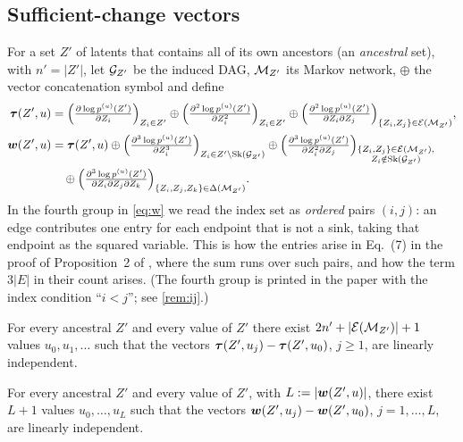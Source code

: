 \subsection{Sufficient-change vectors}
For a set $Z'$ of latents that contains all of its own ancestors (an \emph{ancestral} set), with
$n'=|Z'|$, let $\mathcal{G}_{Z'}$ be the induced DAG, $\mathcal{M}_{Z'}$ its Markov network, $\oplus$ the vector 
concatenation symbol and define
\begin{align}
\boldsymbol{\tau}(Z',u) &= \Bigl(\tfrac{\partial\log p^{(u)}(Z')}{\partial Z_i}\Bigr)_{Z_i\in Z'}
\oplus\Bigl(\tfrac{\partial^2\log p^{(u)}(Z')}{\partial Z_i^2}\Bigr)_{Z_i\in Z'}
\oplus\Bigl(\tfrac{\partial^2\log p^{(u)}(Z')}{\partial Z_i\partial Z_j}\Bigr)_{\{Z_i,Z_j\}\in \mathcal{E}(\mathcal{M}_{Z'})},
\label{eq:tau}\\[2pt]
\boldsymbol{w}(Z',u) &= \boldsymbol{\tau}(Z',u)
\oplus\Bigl(\tfrac{\partial^3\log p^{(u)}(Z')}{\partial Z_i^3}\Bigr)_{Z_i\in Z'\setminus\mathrm{Sk}(\mathcal{G}_{Z'})}
\oplus\Bigl(\tfrac{\partial^3\log p^{(u)}(Z')}{\partial Z_i^2\partial Z_j}\Bigr)_{\substack{\{Z_i,Z_j\}\in \mathcal{E}(\mathcal{M}_{Z'}),\\ Z_i\notin\mathrm{Sk}(\mathcal{G}_{Z'})}} \nonumber \\
& \quad \oplus\Bigl(\tfrac{\partial^3\log p^{(u)}(Z')}{\partial Z_i\partial Z_j\partial Z_k}\Bigr)_{\{Z_i,Z_j,Z_k\}\in\Delta(\mathcal{M}_{Z'})}.
\label{eq:w}
\end{align}
In the fourth group in \cref{eq:w} we read the index set as \emph{ordered} pairs $(i,j)$: an edge contributes one entry for each endpoint that is not a sink, taking that endpoint as the squared variable. This is how
the entries arise in Eq.~(7) in the proof of Proposition~2 of \cite{ng2025}, where the sum runs over
such pairs, and how the term $3|E|$ in their count arises. (The fourth group is printed in the paper with
the index condition ``$i<j$''; see \cref{rem:ij}.)

\begin{assumption}\label{as:1}
For every ancestral $Z'$ and every value of $Z'$ there exist $2n'+|\mathcal{E}(\mathcal{M}_{Z'})|+1$ values
$u_0,u_1,\dots$ such that the vectors $\boldsymbol{\tau}(Z',u_j)-\boldsymbol{\tau}(Z',u_0)$, $j\ge1$, are linearly
independent.
\end{assumption}

\begin{assumption}\label{as:2}
For every ancestral $Z'$ and every value of $Z'$, with $L:=|\boldsymbol{w}(Z',u)|$, there exist $L+1$ values
$u_0,\dots,u_L$ such that the vectors $\boldsymbol{w}(Z',u_j)-\boldsymbol{w}(Z',u_0)$, $j=1,\dots,L$, are linearly
independent.
\end{assumption}

